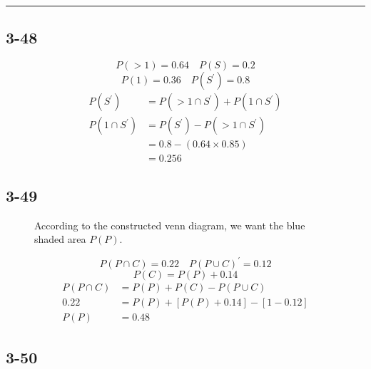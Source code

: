 \documentclass{article}
\newcommand{\qline}{\par\noindent\rule{4.5in}{1pt}}
\begin{document}
	\qline

		\subsection*{3-48}

			\[
				P(>1) = 0.64 \quad P(S) = 0.2
			\]
			\[
				P(1) = 0.36 \quad P(S^\prime) = 0.8
			\]
			\begin{align*}
				P(S^\prime) &= P(>1 \cap S^\prime) + P(1 \cap S^\prime) \\
				P(1 \cap S^\prime) &= P(S^\prime) - P(>1 \cap S^\prime) \\
				&= 0.8 - (0.64 \times 0.85) \\
				&= \boxed{0.256}
			\end{align*}

	\clearpage

		\subsection*{3-49}

		\begin{figure}[!h]
			\centering
			 \par
			According to the constructed venn diagram, we want the blue shaded area $P(P)$.
		\end{figure}
		\[
			P(P \cap C) = 0.22 \quad P(P \cup C)^\prime	= 0.12
		\]
		\[
			P(C) = P(P) + 0.14
		\]
		\begin{align*}
			P(P \cap C) &= P(P) + P(C) - P(P \cup C) \\
			0.22 &= P(P) + \left[ P(P) + 0.14 \right] - \left[ 1 - 0.12 \right] \\
			P(P) &= \boxed{0.48}
		\end{align*}

	\clearpage

	\subsection*{3-50}
\end{document}
